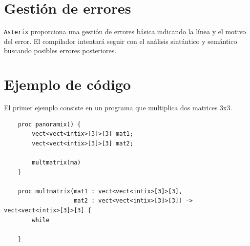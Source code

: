 \documentclass[a4paper, 10pt]{article}
\newcommand{\atx}{\texttt{Asterix} }
\begin{document}
    \section*{Gestión de errores}
    \atx proporciona una gestión de errores básica indicando la línea y el motivo
    del error. El compilador intentará seguir con el análisis sintántico y semántico
    buscando posibles errores posteriores.

    \section*{Ejemplo de código}
    El primer ejemplo consiste en un programa que multiplica dos matrices 3x3.
    \begin{verbatim}
    proc panoramix() {
        vect<vect<intix>[3]>[3] mat1;
        vect<vect<intix>[3]>[3] mat2;

        multmatrix(ma)
    }

    proc multmatrix(mat1 : vect<vect<intix>[3]>[3],
                    mat2 : vect<vect<intix>[3]>[3]) -> vect<vect<intix>[3]>[3] {
        while 

    }
    \end{verbatim}
\end{document}
